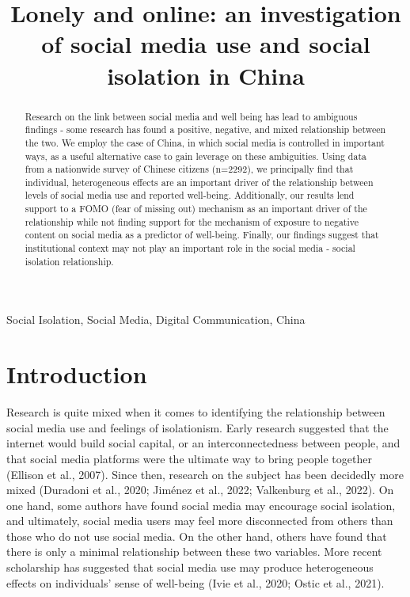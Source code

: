 \documentclass[]{interact}
\theoremstyle{plain}%
\theoremstyle{definition}
\theoremstyle{remark}
\begin{document}
\title{Lonely and online: an investigation of social media use and
social isolation in China}



\author{
}

\maketitle

\begin{abstract}
Research on the link between social media and well being has lead to
ambiguous findings - some research has found a positive, negative, and
mixed relationship between the two. We employ the case of China, in
which social media is controlled in important ways, as a useful
alternative case to gain leverage on these ambiguities. Using data from
a nationwide survey of Chinese citizens (n=2292), we principally find
that individual, heterogeneous effects are an important driver of the
relationship between levels of social media use and reported well-being.
Additionally, our results lend support to a FOMO (fear of missing out)
mechanism as an important driver of the relationship while not finding
support for the mechanism of exposure to negative content on social
media as a predictor of well-being. Finally, our findings suggest that
institutional context may not play an important role in the social media
- social isolation relationship.
\end{abstract}

\begin{keywords}
    Social Isolation, Social Media, Digital Communication, 
    China
\end{keywords}
\newpage{}

\section{Introduction}\label{introduction}

Research is quite mixed when it comes to identifying the relationship
between social media use and feelings of isolationism. Early research
suggested that the internet would build social capital, or an
interconnectedness between people, and that social media platforms were
the ultimate way to bring people together (Ellison et al., 2007). Since
then, research on the subject has been decidedly more mixed (Duradoni et
al., 2020; Jiménez et al., 2022; Valkenburg et al., 2022). On one hand,
some authors have found social media may encourage social isolation, and
ultimately, social media users may feel more disconnected from others
than those who do not use social media. On the other hand, others have
found that there is only a minimal relationship between these two
variables. More recent scholarship has suggested that social media use
may produce heterogeneous effects on individuals' sense of well-being
(Ivie et al., 2020; Ostic et al., 2021).
\end{document}
